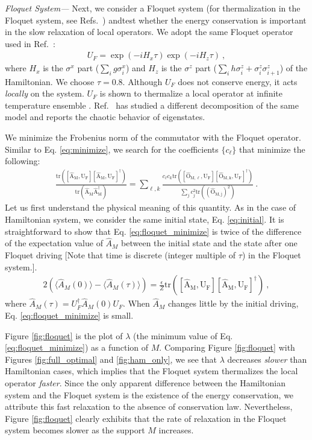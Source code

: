 \documentclass[twocolumn,superscriptaddress, prb]{revtex4-1}
\begin{document}
{\it Floquet System---}
Next, we consider a Floquet system (for thermalization in the Floquet system, see Refs.~) andtest whether the energy conservation is important in the slow relaxation of local operators.
We adopt the same Floquet operator used in Ref.~:
\begin{align}
U_F = \exp(-i H_x \tau) \exp(-i H_z \tau) ~,
\end{align}
where $H_x$ is the $\sigma^x$ part ($\sum_i g \sigma^x_i$) and $H_z$ is the $\sigma^z$ part ($\sum_i h \sigma^z_i +\sigma^z_i \sigma^z_{i+1}$)
of the Hamiltonian. We choose $\tau = 0.8$.
Although $U_F$ does not conserve energy, it acts {\it locally} on the system.
$U_F$ is shown to thermalize a local operator at infinite temperature ensemble \cite{Kim_ETH}.
Ref.~ has studied a different decomposition of the same model and reports the chaotic behavior of eigenstates.

We minimize the Frobenius norm of the commutator with the Floquet operator.
Similar to Eq. \eqref{eq:minimize}, we search for the coefficients $\{ c_\ell \}$ that minimize the following:
\begin{align}\label{eq:floquet_minimize}
\frac{\mathrm{tr([\hat{A}_M,U_F][\hat{A}_M,U_F]^\dag)}}{\mathrm{tr(\hat{A}_M\hat{A}^\dag_M)}} = \sum_{\ell,k}\frac{c_\ell c_k \mathrm{tr([\hat{O}_{M,\ell},U_F][\hat{O}_{M,k},U_F]^\dag)}}{\sum_j c_j ^2 \mathrm{tr((\hat{O}_{M,j})^2)}} ~.
\end{align}
Let us first understand the physical meaning of this quantity.
As in the case of Hamiltonian system, we consider the same initial state, Eq. \eqref{eq:initial}.
It is straightforward to show that Eq. \eqref{eq:floquet_minimize} is twice of the
difference of the expectation value of $\hat{A}_M$ between the initial state and the state after one Floquet driving
[Note that time is discrete (integer multiple of $\tau$) in the Floquet system.].
\begin{align}
2\left(\langle \hat{A}_M(0) \rangle - \langle \hat{A}_M(\tau) \rangle \right) = \frac{\epsilon}{Z}\mathrm{tr([\hat{A}_M,U_F][\hat{A}_M,U_F]^\dag)} ~,
\end{align}
where $\hat{A}_M(\tau) = U_F^\dag \hat{A}_M(0) U_F$.
When $\hat{A}_M$ changes little by the initial driving, Eq. \eqref{eq:floquet_minimize} is small.

Figure \ref{fig:floquet} is the plot of $\lambda$ (the minimum value of Eq. \ref{eq:floquet_minimize}) as a function of $M$.
Comparing Figure \ref{fig:floquet} with Figures \ref{fig:full_optimal} and \ref{fig:ham_only},
we see that $\lambda$ decreases {\it slower} than Hamiltonian cases, which implies that the Floquet system thermalizes
the local operator {\it faster}. Since the only apparent difference between the Hamiltonian system and the Floquet system
is the existence of the energy conservation, we attribute this fast relaxation to the absence of conservation law.
Nevertheless, Figure \ref{fig:floquet} clearly exhibits that the rate of relaxation in the Floquet system 
becomes slower as the support $M$ increases. 
\end{document}
